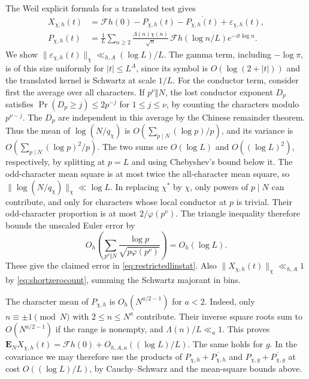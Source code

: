 \documentclass[11pt,a4paper]{article}
\numberwithin{equation}{section}
\begin{document}
The Weil explicit formula for a translated test
\cite[Lemma~1]{TZLiu} gives
\begin{equation}
 \begin{aligned}
 X_{\chi,h}(t)&=\mathcal Fh(0)-P_{\chi,h}(t)
    -\overline{P_{\chi,h}(t)}+\varepsilon_{\chi,h}(t),\\
 P_{\chi,h}(t)&=\frac1L\sum_{n\ge2}
       \frac{\Lambda(n)\chi(n)}{\sqrt n}\,
          \mathcal Fh(\log n/L)e^{-it\log n}.
 \end{aligned}
 \label{eq:restrictedlinstat}
\end{equation}
We show $\|\varepsilon_{\chi,h}(t)\|_\chi
\ll_{h,A}(\log L)/L$. The gamma term, including $-\log\pi$,
is of this size uniformly for $|t|\le L^A$, since its symbol
is $O(\log(2+|t|))$ and the translated kernel is Schwartz at
scale $1/L$.
For the conductor term, consider first the average over all
characters. If $p^\nu\Vert N$, the lost conductor exponent
$D_p$ satisfies $\Pr(D_p\ge j)\le2p^{-j}$ for
$1\le j\le\nu$, by counting the characters modulo $p^{\nu-j}$.
The $D_p$ are independent in this average by the Chinese
remainder theorem. Thus the mean of $\log(N/q_\chi)$ is
$O(\sum_{p\mid N}(\log p)/p)$, and its variance is
$O(\sum_{p\mid N}(\log p)^2/p)$. The two sums are
$O(\log L)$ and $O((\log L)^2)$, respectively, by
splitting at $p=L$ and using Chebyshev's bound below it.
The odd-character mean square is at most twice the
all-character mean square, so $\|\log(N/q_\chi)\|_\chi\ll\log L$.
In replacing $\chi^*$ by $\chi$, only powers of $p\mid N$
can contribute, and only for characters whose local conductor
at $p$ is trivial. Their odd-character proportion is at most
$2/\varphi(p^\nu)$. The triangle inequality therefore bounds
the unscaled Euler error by
\[
 O_h\!\left(\sum_{p^\nu\Vert N}
      \frac{\log p}{\sqrt{p\varphi(p^\nu)}}\right)=O_h(\log L).
\]
These give the claimed error in \cref{eq:restrictedlinstat}.
Also $\|X_{\chi,h}(t)\|_\chi\ll_{h,A}1$ by
\cref{eq:shortzerocount}, summing the Schwartz majorant in bins.

The character mean of $P_{\chi,h}$ is $O_h(N^{a/2-1})$
for $a<2$. Indeed, only $n\equiv\pm1\pmod N$ with
$2\le n\le N^a$ contribute. Their inverse square roots sum
to $O(N^{a/2-1})$ if the range is nonempty, and
$\Lambda(n)/L\ll_a1$. This proves
$\mathbf E_N X_{\chi,h}(t)=\mathcal Fh(0)+O_{h,A,a}((\log L)/L)$.
The same holds for $g$. In the covariance we may therefore
use the products of $P_{\chi,h}+\overline{P_{\chi,h}}$ and
$P_{\chi,g}+\overline{P_{\chi,g}}$ at cost $O((\log L)/L)$,
by Cauchy--Schwarz and the mean-square bounds above.
\end{document}
